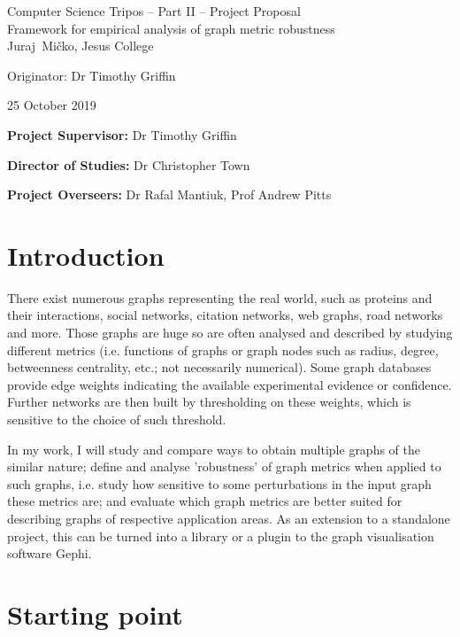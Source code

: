 \documentclass[12pt,a4paper,twoside]{article}
\begin{document}
\begin{center}
	\Large
	Computer Science Tripos -- Part II -- Project Proposal\\[4mm]
	\LARGE
	Framework for empirical analysis of graph metric robustness\\[4mm]
	
	\large
	Juraj~Mi\v{c}ko, Jesus College
	
	Originator: Dr Timothy Griffin
	
	25 October 2019
\end{center}

\vspace{5mm}

\textbf{Project Supervisor:} Dr Timothy Griffin

\textbf{Director of Studies:} Dr Christopher Town

\textbf{Project Overseers:} Dr Rafal Mantiuk, Prof Andrew Pitts

\section*{Introduction}

	There exist numerous graphs representing the real world, such as proteins and their interactions, social networks, citation networks, web graphs, road networks and more. Those graphs are huge so are often analysed and described by studying different metrics (i.e. functions of graphs or graph nodes such as radius, degree, betweenness centrality, etc.; not necessarily numerical). Some graph databases provide edge weights indicating the available experimental evidence or confidence. Further networks are then built by thresholding on these weights, which is sensitive to the choice of such threshold.

    In my work, I will study and compare ways to obtain multiple graphs of the similar nature; define and analyse 'robustness' of graph metrics when applied to such graphs, i.e. study how sensitive to some perturbations in the input graph these metrics are; and evaluate which graph metrics are better suited for describing graphs of respective application areas. As an extension to a standalone project, this can be turned into a library or a plugin to the graph visualisation software Gephi.

\section*{Starting point}
\end{document}
